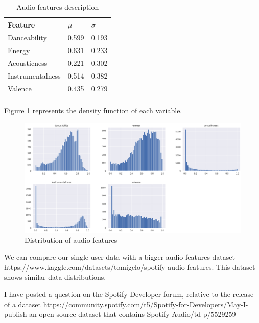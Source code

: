 \documentclass[sn-mathphys]{sn-jnl}%
\theoremstyle{thmstyleone}%
\theoremstyle{thmstyletwo}%
\theoremstyle{thmstylethree}%
\begin{document}
\begin{table}[h]
      \begin{center}
      \begin{minipage}{\textwidth}
      \caption{Audio features description}\label{audio_features_stats}%
      \begin{tabular}{@{}lll@{}}
      \toprule
      Feature           & $\mu$ & $\sigma$ \\
      \midrule
      Danceability      & 0.599  & 0.193  \\
      Energy            & 0.631  & 0.233  \\
      Acousticness      & 0.221  & 0.302  \\
      Instrumentalness  & 0.514  & 0.382  \\
      Valence           & 0.435  & 0.279  \\
      \botrule
      \end{tabular}
      \end{minipage}
      \end{center}
\end{table}

Figure \ref{fig:audio_features_distribution} represents the density function of each variable.

\begin{figure}[h!]
      \centering
      \includegraphics[width=\textwidth]{images/features-distribution.png}
      \caption{Distribution of audio features}
      \label{fig:audio_features_distribution}
\end{figure}

We can compare our single-user data with a bigger audio features dataset https://www.kaggle.com/datasets/tomigelo/spotify-audio-features.
This dataset shows similar data distributions.

I have posted a question on the Spotify Developer forum, relative to the release of a dataset
https://community.spotify.com/t5/Spotify-for-Developers/May-I-publish-an-open-source-dataset-that-contains-Spotify-Audio/td-p/5529259
\end{document}
